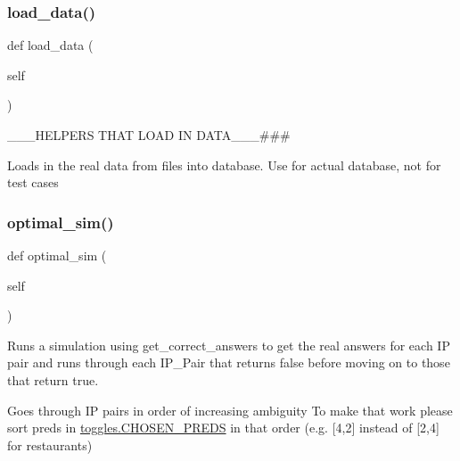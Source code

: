 \subsubsection{\texorpdfstring{load\_data()}{load\_data()}}
{\footnotesize\ttfamily def load\+\_\+data (\begin{DoxyParamCaption}\item[{}]{self }\end{DoxyParamCaption})}



\+\_\+\+\_\+\+\_\+\+H\+E\+L\+P\+E\+RS T\+H\+AT L\+O\+AD IN D\+A\+T\+A\+\_\+\+\_\+\+\_\+\#\#\# 

\begin{DoxyVerb}Loads in the real data from files into database. Use for actual database, not for test cases
\end{DoxyVerb}
 \mbox{\label{classdynamicfilterapp_1_1test__simulations_1_1_simulation_test_a3485447162eb85b9d98dd4ebd84c6e50}} 
\subsubsection{\texorpdfstring{optimal\_sim()}{optimal\_sim()}}
{\footnotesize\ttfamily def optimal\+\_\+sim (\begin{DoxyParamCaption}\item[{}]{self }\end{DoxyParamCaption})}



Runs a simulation using get\+\_\+correct\+\_\+answers to get the real answers for each IP pair and runs through each I\+P\+\_\+\+Pair that returns false before moving on to those that return true. 

Goes through IP pairs in order of increasing ambiguity To make that work please sort preds in \mbox{\hyperlink{namespacedynamicfilterapp_1_1toggles_a1e059d484294d0a2661de21590419600}{toggles.\+C\+H\+O\+S\+E\+N\+\_\+\+P\+R\+E\+DS}} in that order (e.\+g. \mbox{[}4,2\mbox{]} instead of \mbox{[}2,4\mbox{]} for restaurants) \mbox{\label{classdynamicfilterapp_1_1test__simulations_1_1_simulation_test_a6dfab9d9ce87cf8f1421f01d5e9051e0}} 

